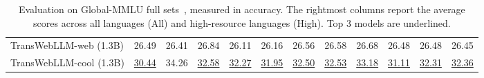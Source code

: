 \begin{table*}[!t]
{\begin{tabular}{l|ccccccc|c|c|cc}
TransWebLLM-web (1.3B) & 26.49 & 26.41 & 26.84 & 26.11 & 26.16 & 26.56 & 26.58 & 26.68 & 26.48 & 26.48 & 26.45 \\
TransWebLLM-cool (1.3B) & \underline{30.44} & 34.26 & \underline{32.58} & \underline{32.27} & \underline{31.95} & \underline{32.50} & \underline{32.53} & \underline{33.18} & \underline{31.11} & \underline{32.31} & \underline{32.36} \\
\bottomrule
\end{tabular}}
\caption{Evaluation on Global-MMLU full sets~\citep{singh2024global}, measured in accuracy. The rightmost columns report the average scores across all languages (All) and high-resource languages (High). Top 3 models are underlined.}
\label{tab:main_mmlu}
\end{table*}
